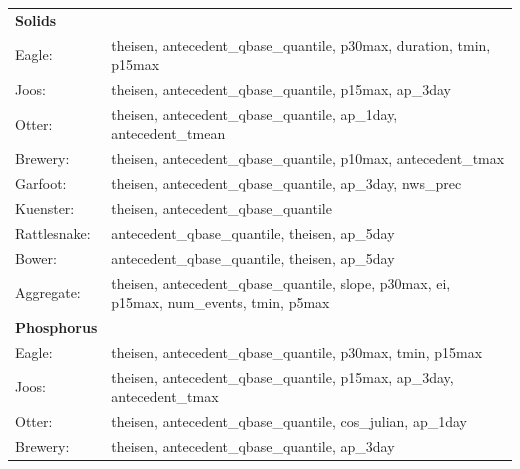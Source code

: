 \documentclass[10pt]{article}
\begin{document}
\begin{table}[h!]\small
    \begin{center}
    \begin{tabular}{ll}
        \textbf{Solids} & \\
        \hspace{5mm} Eagle: & theisen, antecedent\_qbase\_quantile, p30max, duration, tmin, p15max\\
        \hspace{5mm} Joos: & theisen, antecedent\_qbase\_quantile, p15max, ap\_3day\\
        \hspace{5mm} Otter: & theisen, antecedent\_qbase\_quantile, ap\_1day, antecedent\_tmean\\
        \hspace{5mm} Brewery: & theisen, antecedent\_qbase\_quantile, p10max, antecedent\_tmax\\
        \hspace{5mm} Garfoot: & theisen, antecedent\_qbase\_quantile, ap\_3day, nws\_prec\\
        \hspace{5mm} Kuenster: & theisen, antecedent\_qbase\_quantile\\
        \hspace{5mm} Rattlesnake: & antecedent\_qbase\_quantile, theisen, ap\_5day \\
        \hspace{5mm} Bower: & antecedent\_qbase\_quantile, theisen, ap\_5day\\
        \hspace{5mm} Aggregate: & theisen, antecedent\_qbase\_quantile, slope, p30max, ei, p15max, num\_events, tmin, p5max
    \vspace{2mm}\\
        \textbf{Phosphorus} & \\
        \hspace{5mm} Eagle: & theisen, antecedent\_qbase\_quantile, p30max, tmin, p15max\\
        \hspace{5mm} Joos: & theisen, antecedent\_qbase\_quantile, p15max, ap\_3day, antecedent\_tmax\\
        \hspace{5mm} Otter: & theisen, antecedent\_qbase\_quantile, cos\_julian, ap\_1day\\
        \hspace{5mm} Brewery: & theisen, antecedent\_qbase\_quantile, ap\_3day\\

\end{tabular}
\end{center}
\end{table}
\end{document}
